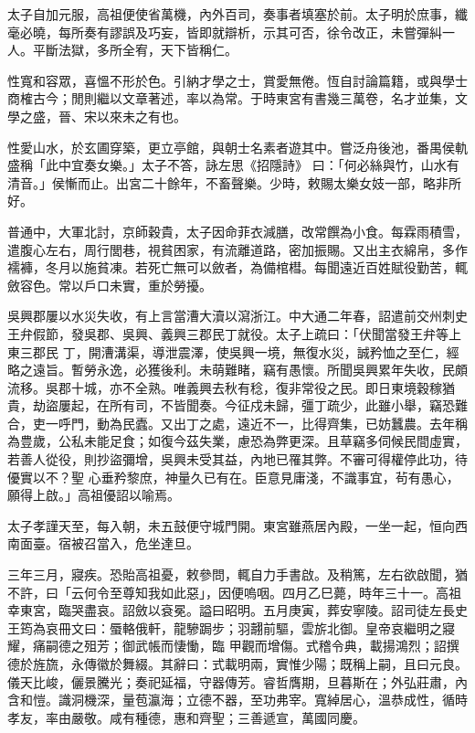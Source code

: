 \begin{pinyinscope}
 太子自加元服，高祖便使省萬機，內外百司，奏事者填塞於前。太子明於庶事，纖毫必曉，每所奏有謬誤及巧妄，皆即就辯析，示其可否，徐令改正，未嘗彈糾一人。平斷法獄，多所全宥，天下皆稱仁。



 性寬和容眾，喜慍不形於色。引納才學之士，賞愛無倦。恆自討論篇籍，或與學士商榷古今；閒則繼以文章著述，率以為常。于時東宮有書幾三萬卷，名才並集，文學之盛，晉、宋以來未之有也。



 性愛山水，於玄圃穿築，更立亭館，與朝士名素者遊其中。嘗泛舟後池，番禺侯軌盛稱「此中宜奏女樂。」太子不答，詠左思《招隱詩》
 曰：「何必絲與竹，山水有清音。」侯慚而止。出宮二十餘年，不畜聲樂。少時，敕賜太樂女妓一部，略非所好。



 普通中，大軍北討，京師穀貴，太子因命菲衣減膳，改常饌為小食。每霖雨積雪，遣腹心左右，周行閭巷，視貧困家，有流離道路，密加振賜。又出主衣綿帛，多作襦褲，冬月以施貧凍。若死亡無可以斂者，為備棺槥。每聞遠近百姓賦役勤苦，輒斂容色。常以戶口未實，重於勞擾。



 吳興郡屢以水災失收，有上言當漕大瀆以瀉浙江。中大通二年春，詔遣前交州刺史王弁假節，發吳郡、吳興、義興三郡民丁就役。太子上疏曰：「伏聞當發王弁等上東三郡民
 丁，開漕溝渠，導泄震澤，使吳興一境，無復水災，誠矜恤之至仁，經略之遠旨。暫勞永逸，必獲後利。未萌難睹，竊有愚懷。所聞吳興累年失收，民頗流移。吳郡十城，亦不全熟。唯義興去秋有稔，復非常役之民。即日東境穀稼猶貴，劫盜屢起，在所有司，不皆聞奏。今征戍未歸，彊丁疏少，此雖小舉，竊恐難合，吏一呼門，動為民蠹。又出丁之處，遠近不一，比得齊集，已妨蠶農。去年稱為豊歲，公私未能足食；如復今茲失業，慮恐為弊更深。且草竊多伺候民間虛實，若善人從役，則抄盜彌增，吳興未受其益，內地已罹其弊。不審可得權停此功，待優實以不？聖
 心垂矜黎庶，神量久已有在。臣意見庸淺，不識事宜，茍有愚心，願得上啟。」高祖優詔以喻焉。



 太子孝謹天至，每入朝，未五鼓便守城門開。東宮雖燕居內殿，一坐一起，恒向西南面臺。宿被召當入，危坐達旦。



 三年三月，寢疾。恐貽高祖憂，敕參問，輒自力手書啟。及稍篤，左右欲啟聞，猶不許，曰「云何令至尊知我如此惡」，因便嗚咽。四月乙巳薨，時年三十一。高祖幸東宮，臨哭盡哀。詔斂以袞冕。謚曰昭明。五月庚寅，葬安寧陵。詔司徒左長史王筠為哀冊文曰：蜃輅俄軒，龍驂跼步；羽翿前驅，雲旂北御。皇帝哀繼明之寢耀，痛嗣德之殂芳；御武帳而悽慟，臨
 甲觀而增傷。式稽令典，載揚鴻烈；詔撰德於旌旒，永傳徽於舞綴。其辭曰：式載明兩，實惟少陽；既稱上嗣，且曰元良。儀天比峻，儷景騰光；奏祀延福，守器傳芳。睿哲膺期，旦暮斯在；外弘莊肅，內含和愷。識洞機深，量苞瀛海；立德不器，至功弗宰。寬綽居心，溫恭成性，循時孝友，率由嚴敬。咸有種德，惠和齊聖；三善遞宣，萬國同慶。




\end{pinyinscope}
